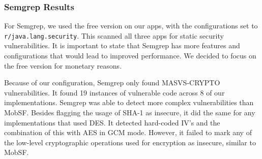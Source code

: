 \subsubsection{Semgrep Results}
For Semgrep, we used the free version on our apps, with the configurations set to \texttt{r/java.lang.security}. This scanned all three apps for static security vulnerabilities. It is important to state that Semgrep has more features and configurations that would lead to improved performance. We decided to focus on the free version for monetary reasons. 

Because of our configuration, Semgrep only found MASVS-CRYPTO vulnerabilities. It found 19 instances of vulnerable code across 8 of our implementations. Semgrep was able to detect more complex vulnerabilities than MobSF. Besides flagging the usage of SHA-1 as insecure, it did the same for any implementations that used DES. It detected hard-coded IV's and the combination of this with AES in GCM mode. However, it failed to mark any of the low-level cryptographic operations used for encryption as insecure, similar to MobSF.

